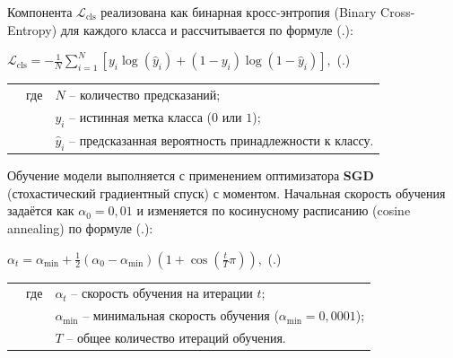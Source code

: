 {  \par \redline Компонента $\mathcal{L}_{\mathrm{cls}}$ реализована как бинарная кросс-энтропия (Binary Cross-Entropy) для каждого класса и рассчитывается по формуле (\thechaptercntr .\theformulacntr):

  \formulaspace 
  \par \redline $\mathcal{L}_{\mathrm{cls}} = -\frac{1}{N} \sum_{i=1}^{N} \left[ y_i \log(\hat{y}_i) + (1 - y_i)\log(1 - \hat{y}_i) \right],$
  \hfill (\thechaptercntr .\theformulacntr) \hspace*{-0.5cm}\redline
  \formulaspace \addtocounter{formulacntr}{1}

  \begin{tabular}{p{0.875cm}p{0.3cm}p{15.175cm}}
      & где  & $N$ {--} количество предсказаний; \\
      &      & $y_i$ {--} истинная метка класса ($0$ или $1$); \\
      &      & $\hat{y}_i$ {--} предсказанная вероятность принадлежности к классу. \\
  \end{tabular}
  \vspace{13pt}

  \par \redline Обучение модели выполняется с применением оптимизатора \textbf{SGD} (стохастический градиентный спуск) с моментом. Начальная скорость обучения задаётся как $\alpha_0 = 0{,}01$ и изменяется по косинусному расписанию (cosine annealing) по формуле (\thechaptercntr .\theformulacntr):

  \formulaspace 
  \par \redline $\alpha_t = \alpha_{\min} + \frac{1}{2}(\alpha_0 - \alpha_{\min})\left(1 + \cos\!\left(\frac{t}{T}\pi\right)\right),$
  \hfill (\thechaptercntr .\theformulacntr) \hspace*{-0.5cm}\redline
  \formulaspace \addtocounter{formulacntr}{1}

  \begin{tabular}{p{0.875cm}p{0.3cm}p{15.175cm}}
      & где  & $\alpha_t$ {--} скорость обучения на итерации $t$; \\
      &      & $\alpha_{\min}$ {--} минимальная скорость обучения ($\alpha_{\min} = 0{,}0001$); \\
      &      & $T$ {--} общее количество итераций обучения. \\
  \end{tabular}
  \vspace{13pt}

}
